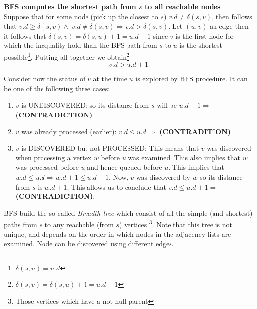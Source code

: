 \begin{theorem}{\textbf{BFS computes the shortest path from $s$ to all reachable nodes}\hfill \\}
Suppose that for some node (pick up the closest to $s$) $v.d \neq \delta(s,v)$,  then follows that $v.d \geq \delta(s,v)  \wedge \; v.d \neq \delta(s,v) \Rightarrow  v.d > \delta(s,v) $. Let $(u,v)$ an edge then it follows that $\delta(s,v) = \delta(s,u) + 1 = u.d +1$ since $v$ is the first node for which the inequality hold than the BFS path from $s$ to $u$ is the shortest possible\footnote{$\delta(s,u) = u.d$}.
Putting all together we obtain\footnote{$\delta(s,v) = \delta(s,u) + 1 = u.d +1$} 
\[
v.d > u.d + 1 
\]

Consider now the status of $v$ at the time $u$ is explored by BFS procedure. It can be one of the following three cases:
\begin{enumerate}
\item $v$ is UNDISCOVERED: so its distance from $s$ will be $u.d +1 \Rightarrow$ (\textbf{CONTRADICTION)}
\item $v$ was already processed (earlier): $v.d \leq u.d \Rightarrow$ \textbf{(CONTRADITION)}
\item $v$ is DISCOVERED but not PROCESSED: This means that $v$ was discovered when processing a vertex $w$ before $u$ was examined. This also implies that $w$ was processed before $u$ and hence queued before $u$. This implies that $ w.d \leq u.d \Rightarrow w.d+1 \leq u.d +1$. Now, $v$ was discovered by $w$ so its distance from $s$ is $w.d+1$. This allows us to conclude that $v.d \leq u.d+1 \Rightarrow$\textbf{(CONTRADICTION)}.
\end{enumerate}
\end{theorem}

BFS build the so called \textit{Breadth tree} which consist of all the simple (and shortest) paths from $s$ to any reachable (from $s$) vertices \footnote{Those vertices which have a not null parent}. Note that this tree is not unique, and depends on the order in which nodes in the adjacency lists are examined. Node can be discovered using different edges.


